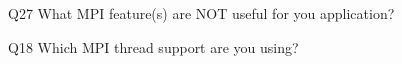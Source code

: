 \begin{description}%
\item{Q27} What MPI feature(s) are NOT useful for you application?%
\item{Q18} Which MPI thread support are you using?%
\end{description}%
